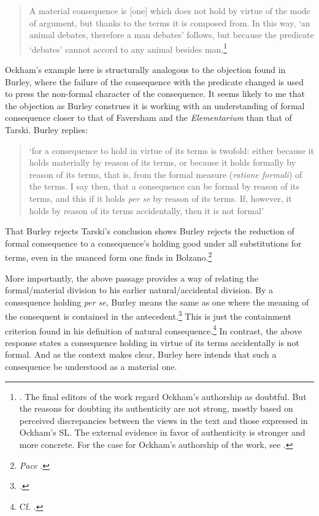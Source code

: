\documentclass[]{article}
\begin{document}
\begin{quote}
	A material consequence is [one] which does not hold by virtue of the mode of argument, but thanks to the terms it is composed from. In this way, `an animal debates, therefore a man debates' follows, but because the predicate `debates' cannot accord to any animal besides man.\footnote{\cite[VI.4, p. 163]{OckhamEL}. The final editors of the work regard Ockham's authorship as doubtful. But the reasons for doubting its authenticity are not strong, mostly based on perceived discrepancies between the views in the text and those expressed in Ockham's SL. The external evidence in favor of authenticity is stronger and more concrete. For the case for Ockham's authorship of the work, see \cite{Boehner1958b}.}
\end{quote}

Ockham's example here is structurally analogous to the objection found in Burley, where the failure of the consequence with the predicate changed is used to press the non-formal character of the consequence. It seems likely to me that the objection as Burley construes it is working with an understanding of formal consequence closer to that of Faversham and the \textit{Elementarium} than that of Tarski. Burley replies:
\begin{quote}
	`for a consequence to hold in virtue of its terms is twofold: either because it holds materially by reason of its terms, or because it holds formally by reason of its terms, that is, from the formal measure (\textit{ratione formali}) of the terms. I say then, that a consequence can be formal by reason of its terms, and this if it holds \textit{per se} by reason of its terms. If, however, it holds by reason of its terms accidentally, then it is not formal'
\end{quote}
That Burley rejects Tarski's conclusion shows Burley rejects the reduction of formal consequence to a consequence's holding good under all substitutions for terms, even in the nuanced form one finds in Bolzano.\footnote{\textit{Pace} \cite[pp. 16-17]{HodgesBurley}.} 

More importantly, the above passage provides a way of relating the formal/material division to his earlier natural/accidental division. By a consequence holding \textit{per se}, Burley means the same as one where the meaning of the consequent is contained in the antecedent.\footnote{\cite[p. 158, par. 160]{Green-Pedersen1980b}.} This is just the containment criterion found in his definition of natural consequence.\footnote{Cf. \cite[I, d. 11, q. 2]{ScotusRepPar}.} In contrast, the above response states a consequence holding in virtue of its terms accidentally is not formal. And as the context makes clear, Burley here intends that such a consequence be understood as a material one.
\end{document}
